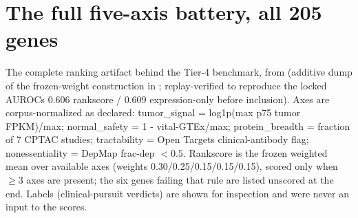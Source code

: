 \section{The full five-axis battery, all 205 genes}
{\sloppy The complete ranking artifact behind the Tier-4 benchmark, from  (additive dump of the frozen-weight construction in ; replay-verified to reproduce the locked AUROCs 0.606 rankscore / 0.609 expression-only before inclusion). Axes are corpus-normalized as declared: tumor\_signal = log1p(max p75 tumor FPKM)/max; normal\_safety = 1 - vital-GTEx/max; protein\_breadth = fraction of 7 CPTAC studies; tractability = Open Targets clinical-antibody flag; nonessentiality = DepMap frac-dep $<0.5$. Rankscore is the frozen weighted mean over available axes (weights 0.30/0.25/0.15/0.15/0.15), scored only when $\ge3$ axes are present; the six genes failing that rule are listed unscored at the end. Labels (clinical-pursuit verdicts) are shown for inspection and were never an input to the scores.\par}
